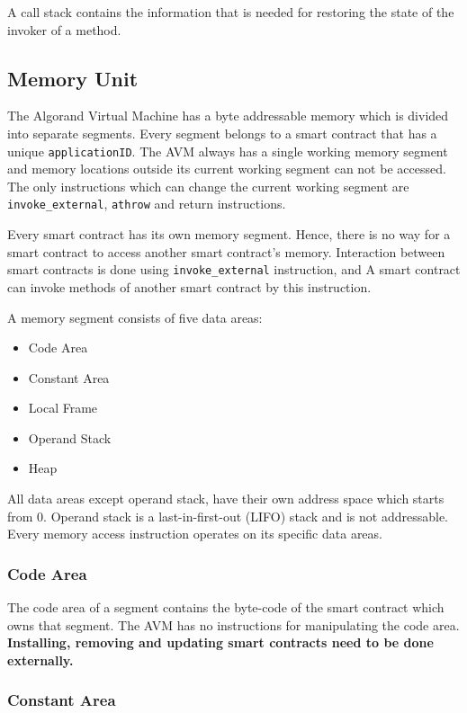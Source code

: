 \documentclass[11pt, A4]{report}
\begin{document}
    A call stack contains the information that is needed for restoring the state of the invoker of a method.

    \subsection{Memory Unit}\label{subsec:memory-unit}

    The Algorand Virtual Machine has a byte addressable memory which is divided into separate segments. Every segment
    belongs to a smart contract that has a unique \texttt{applicationID}. The AVM always has a single working memory
    segment and memory locations outside its current working segment can not be accessed. The only instructions which
    can change the current working segment are \texttt{invoke\_external}, \texttt{athrow} and return instructions.

    Every smart contract has its own memory segment. Hence, there is no way for a smart contract to access another
    smart contract's memory. Interaction between smart contracts is done using \texttt{invoke\_external} instruction,
    and A smart contract can invoke methods of another smart contract by this instruction.

    A memory segment consists of five data areas:
    \begin{itemize}
        \item Code Area
        \item Constant Area
        \item Local Frame
        \item Operand Stack
        \item Heap
    \end{itemize}
    All data areas except operand stack, have their own address space which starts from 0. Operand stack is a
    last-in-first-out (LIFO) stack and is not addressable. Every memory access instruction operates on its specific
    data areas.

    \subsubsection{Code Area}

    The code area of a segment contains the byte-code of the smart contract which owns that segment. The AVM has no
    instructions for manipulating the code area. \textbf{Installing, removing and updating smart contracts need to
    be done externally.}

    \subsubsection{Constant Area}
\end{document}
